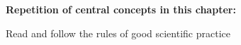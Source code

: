\documentclass{tufte-book}
\begin{document}








\vspace{1cm}
\begin{mdframed}
    
\textbf{Repetition of central concepts in this chapter:} 

\begin{itemize*}
  \item Read and follow the rules of good scientific practice 
\end{itemize*}

\end{mdframed}




\end{document}
